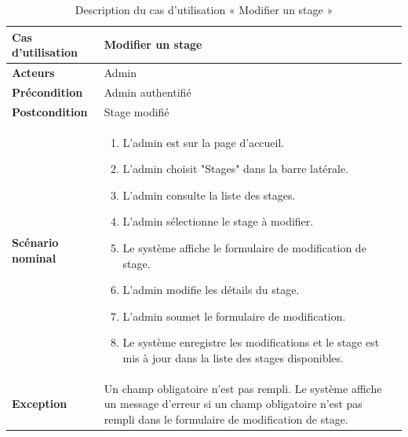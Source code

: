 \begin{sloppypar}
\begin{table}[h]
\centering
\begin{tabular}{|p{3cm}|p{12cm}|}
\hline
\textbf{Cas d'utilisation } & Modifier un stage \\
\hline
\textbf{Acteurs} & Admin \\
\hline
\textbf{Précondition} & Admin authentifié \\
\hline
\textbf{Postcondition} & Stage modifié \\
\hline
\textbf{Scénario nominal} &
\begin{enumerate}
    \item L'admin est sur la page d'accueil.
    \item L'admin choisit "Stages" dans la barre latérale.
    \item L'admin consulte la liste des stages.
    \item L'admin sélectionne le stage à modifier.
    \item Le système affiche le formulaire de modification de stage.
    \item L'admin modifie les détails du stage.
    \item L'admin soumet le formulaire de modification.
    \item Le système enregistre les modifications et le stage est mis à jour dans la liste des stages disponibles.
\end{enumerate} \\
\hline
\textbf{Exception}& Un champ obligatoire n'est pas rempli. Le système affiche un message d'erreur si un champ obligatoire n'est pas rempli dans le formulaire de modification de stage. \\
\hline 
\end{tabular}
\caption{Description du cas d’utilisation « Modifier un stage »}
\end{table}

\newpage


\end{sloppypar}
